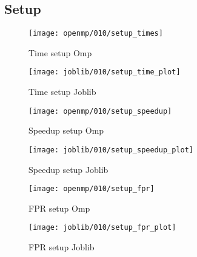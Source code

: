\subsection{Setup}\label{subsec:fpr-010-setup}
\begin{figure}[H]
    \centering
    \texttt{[image: openmp/010/setup\_times]}
        \caption{Time setup Omp}\label{fig:010-setup_time_omp}
    \endminipage\hfill
    \texttt{[image: joblib/010/setup\_time\_plot]}
        \caption{Time setup Joblib}\label{fig:010setup_time_joblib}
    \endminipage\hfill
\end{figure}
\begin{figure}[H]
    \centering
    \texttt{[image: openmp/010/setup\_speedup]}
        \caption{Speedup setup Omp}\label{fig:010-setup_speedup_omp}
    \endminipage\hfill
    \texttt{[image: joblib/010/setup\_speedup\_plot]}
        \caption{Speedup setup Joblib}\label{fig:010-setup_speedup_joblib}
    \endminipage\hfill
\end{figure}
\begin{figure}[H]
    \centering
    \texttt{[image: openmp/010/setup\_fpr]}
        \caption{FPR setup Omp}\label{fig:010-setup_fpr_omp}
    \endminipage\hfill
    \texttt{[image: joblib/010/setup\_fpr\_plot]}
        \caption{FPR setup Joblib}\label{fig:010-setup_fpr_joblib}
    \endminipage\hfill
\end{figure}
